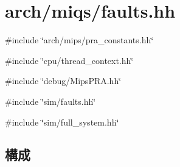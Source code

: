 \hypertarget{arch_2miqs_2faults_8hh}{
\section{arch/miqs/faults.hh}
\label{arch_2miqs_2faults_8hh}
}
{\ttfamily \#include \char`\"{}arch/mips/pra\_\-constants.hh\char`\"{}}\par
{\ttfamily \#include \char`\"{}cpu/thread\_\-context.hh\char`\"{}}\par
{\ttfamily \#include \char`\"{}debug/MipsPRA.hh\char`\"{}}\par
{\ttfamily \#include \char`\"{}sim/faults.hh\char`\"{}}\par
{\ttfamily \#include \char`\"{}sim/full\_\-system.hh\char`\"{}}\par
\subsection*{構成}
